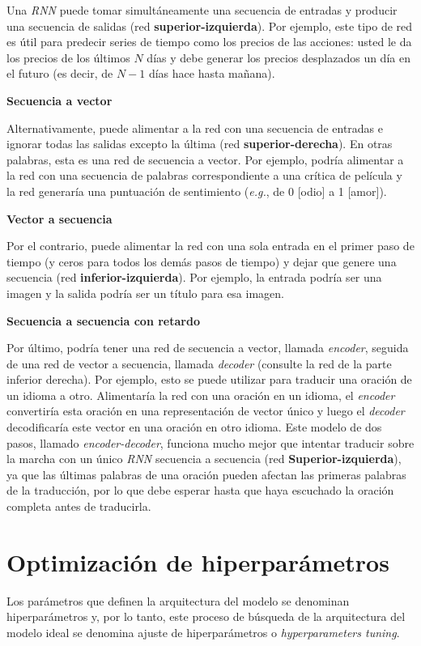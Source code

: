 \documentclass[a4paper,12pt]{article}
\begin{document}
Una \textit{RNN} puede tomar simultáneamente una secuencia de entradas y producir una secuencia de salidas (red \textbf{superior-izquierda}). Por ejemplo, este tipo de red es útil para predecir series de tiempo como los precios de las acciones: usted le da los precios de los últimos $N$ días y debe generar los precios desplazados un día en el futuro (es decir, de $N - 1$ días hace hasta mañana).

\textbf{Secuencia a vector}

Alternativamente, puede alimentar a la red con una secuencia de entradas e ignorar todas las salidas excepto la última (red \textbf{superior-derecha}). En otras palabras, esta es una red de secuencia a vector. Por ejemplo, podría alimentar a la red con una secuencia de palabras correspondiente a una crítica de película y la red generaría una puntuación de sentimiento (\textit{e.g.}, de 0 [odio] a 1 [amor]).

\textbf{Vector a secuencia}

Por el contrario, puede alimentar la red con una sola entrada en el primer paso de tiempo (y ceros para todos los demás pasos de tiempo) y dejar que genere una secuencia (red \textbf{inferior-izquierda}). Por ejemplo, la entrada podría ser una imagen y la salida podría ser un título para esa imagen.

\textbf{Secuencia a secuencia con retardo}

Por último, podría tener una red de secuencia a vector, llamada \textit{encoder}, seguida de una red de vector a secuencia, llamada \textit{decoder} (consulte la red de la parte inferior derecha). Por ejemplo, esto se puede utilizar para traducir una oración de un idioma a otro. Alimentaría la red con una oración en un idioma, el \textit{encoder} convertiría esta oración en una representación de vector único y luego el \textit{decoder} decodificaría este vector en una oración en otro idioma. Este modelo de dos pasos, llamado \textit{encoder-decoder}, funciona mucho mejor que intentar traducir sobre la marcha con un único \textit{RNN} secuencia a secuencia (red \textbf{Superior-izquierda}), ya que las últimas palabras de una oración pueden afectan las primeras palabras de la traducción, por lo que debe esperar hasta que haya escuchado la oración completa antes de traducirla.

\section{Optimización de hiperparámetros} \label{tuning-hp}
Los parámetros que definen la arquitectura del modelo se denominan hiperparámetros y, por lo tanto, este proceso de búsqueda de la arquitectura del modelo ideal se denomina ajuste de hiperparámetros o \textit{hyperparameters tuning}. \citep{Koehrsen2018Jul}
\end{document}
